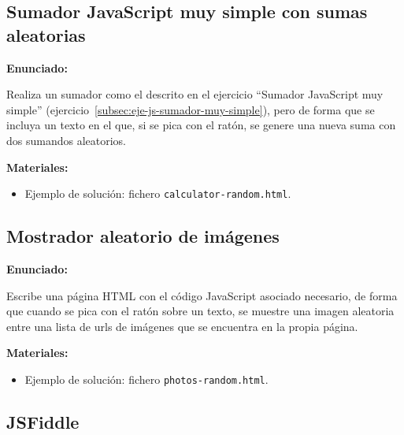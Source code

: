 \subsection{Sumador JavaScript muy simple con sumas aleatorias}
\label{subsec:eje-js-sumador-aleatorio}


\textbf{Enunciado:}

Realiza un sumador como el descrito en el ejercicio ``Sumador JavaScript muy simple'' (ejercicio~\ref{subsec:eje-js-sumador-muy-simple}), pero de forma que se incluya un texto en el que, si se pica con el ratón, se genere una nueva suma con dos sumandos aleatorios.

\textbf{Materiales:}

\begin{itemize}
\item Ejemplo de solución: fichero \verb|calculator-random.html|.
\end{itemize}


\subsection{Mostrador aleatorio de imágenes}
\label{subsec:eje-js-imagenes-aleatorio}


\textbf{Enunciado:}

Escribe una página HTML con el código JavaScript asociado necesario, de forma que cuando se pica con el ratón sobre un texto, se muestre una imagen aleatoria entre una lista de urls de imágenes que se encuentra en la propia página.

\textbf{Materiales:}

\begin{itemize}
\item Ejemplo de solución: fichero \verb|photos-random.html|.
\end{itemize}


\subsection{JSFiddle}
\label{subsec:eje-js-jsfiddle}

